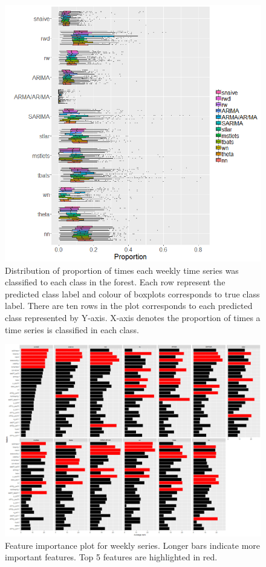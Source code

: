 \documentclass[11pt,a4paper,]{article}
\theoremstyle{definition}
\theoremstyle{definition}
\theoremstyle{definition}
\theoremstyle{remark}
\begin{document}
\begin{figure}
\centering
\includegraphics{figures/oobweekly-1.png}
\caption{\label{fig:oobweekly}Distribution of proportion of times each
weekly time series was classified to each class in the forest. Each row
represent the predicted class label and colour of boxplots corresponds
to true class label. There are ten rows in the plot corresponds to each
predicted class represented by Y-axis. X-axis denotes the proportion of
times a time series is classified in each class.}
\end{figure}

\clearpage

\begin{figure}[h]

{\centering \includegraphics{figures/viweekly-1} 

}

\caption{Feature importance plot for weekly series. Longer bars indicate more important features. Top 5 features are highlighted in red.}\label{fig:viweekly}
\end{figure}
\end{document}

